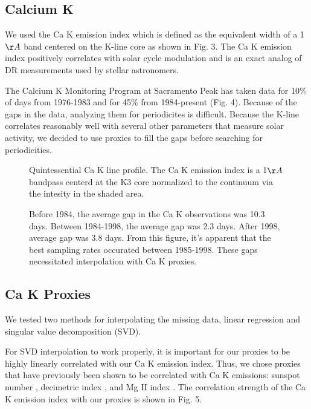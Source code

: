 \documentclass[preprint2]{aastex}
\begin{document}
\subsection{Calcium K}

We used the Ca K emission index which is defined as the equivalent width of a 1$\AA$ band centered on the K-line core as shown in Fig. 3. The Ca K emission index positively correlates with solar cycle modulation and is an exact analog of DR measurements used by stellar astronomers. 

The Calcium K Monitoring Program at Sacramento Peak has taken data for 10\% of days from 1976-1983 \citep{keil84} and for 45\% from 1984-present (Fig. 4). Because of the gaps in the data, analyzing them for periodicites is difficult. Because the K-line correlates reasonably well with several other parameters that measure solar activity, we decided to use proxies to fill the gaps before searching for periodicities.

\begin{figure}[H]
\caption{Quintessential Ca K line profile. The Ca K emission index is a 1$\AA$ bandpass centerd at the K3 core normalized to the continuum via the intesity in the shaded area.\citep{dona95}}
\end{figure}

\begin{figure}[H]
\caption{Before 1984, the average gap in the Ca K observations was 10.3 days. Between 1984-1998, the average gap was 2.3 days. After 1998, average gap was 3.8 days. From this figure, it's apparent that the best sampling rates occurated between 1985-1998. These gaps necessitated interpolation with Ca K proxies.}
\end{figure}

\subsection{Ca K Proxies}

We tested two methods for interpolating the missing data, linear regression and singular value decomposition (SVD).

For SVD interpolation to work properly, it is important for our proxies to be highly linearly correlated with our Ca K emission index. Thus, we chose proxies that have previously been shown to be correlated with Ca K emissions: sunspot number \citep{leig59}, decimetric index \citep{whit81}, and Mg II index \citep{heat86}. The correlation strength of the Ca K emission index with our proxies is shown in Fig. 5.
\end{document}
